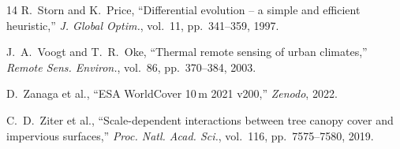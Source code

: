\documentclass[conference]{IEEEtran}
\begin{document}
\begin{thebibliography}{14}
R.~Storn and K.~Price, ``Differential evolution -- a simple and efficient
heuristic,'' \textit{J. Global Optim.}, vol.~11, pp.~341--359, 1997.

J.~A.~Voogt and T.~R.~Oke, ``Thermal remote sensing of urban climates,''
\textit{Remote Sens. Environ.}, vol.~86, pp.~370--384, 2003.

D.~Zanaga et al., ``ESA WorldCover 10\,m 2021 v200,'' \textit{Zenodo}, 2022.

C.~D.~Ziter et al., ``Scale-dependent interactions between tree canopy cover
and impervious surfaces,'' \textit{Proc. Natl. Acad. Sci.}, vol.~116,
pp.~7575--7580, 2019.

\end{thebibliography}
\end{document}
